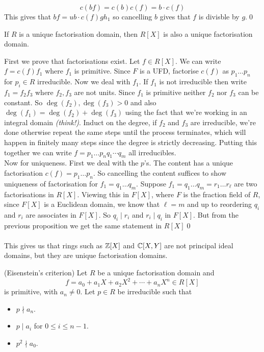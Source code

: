 \documentclass{article}
\begin{document}
\begin{itemize}
\[
  c(bf)=c(b)c(f)=b\cdot c(f)
\]
This gives that $ bf = ub\cdot c(f)gh_1 $ so cancelling $ b $ gives that $ f $ is divisble by $ g $.\qed
\begin{theorem}
	If $ R $ is a unique factorisation domain, then $ R[X] $ is also a unique factorisation domain.
\end{theorem}
\pf First we prove that factorisations exist. Let $ f\in R[X] $. We can write $ f = c(f)f_1 $ where $ f_1 $ is primitive. Since $ F $ is a UFD, factorise $ c(f) $ as $ p_1\dots p_n $ for $ p_i\in R $ irreducible. Now we deal with $ f_1 $. If $ f_1 $ is not irreducible then write $ f_1=f_2f_3 $ where $ f_2,f_3 $ are not units. Since $ f_1 $ is primitive neither $ f_2 $ nor $ f_3 $ can be constant. So $ \deg(f_2),\deg(f_3)>0 $ and also $ \deg(f_1)=\deg(f_2)+\deg(f_3) $ using the fact that we're working in an integral domain \textit{(think!)}. Induct on the degree, if $ f_2 $ and $ f_3 $ are irreducible, we're done otherwise repeat the same steps until the process terminates, which will happen in finitely many steps since the degree is strictly decreasing. Putting this together we can write $ f=p_1\dots p_nq_1\cdots q_m $ all irreducibles.\\
Now for uniqueness. First we deal with the $ p $'s. The content has a unique factorisation $ c(f)=p_1\dots p_n $. So cancelling the content suffices to show uniqueness of factorisation for $ f_1=q_1\dots q_m $. Suppose $ f_1=q_1\dots q_m=r_1\dots r_\ell $ are two factorisations in $ R[X] $. Viewing this in $ F[X] $, where $ F $ is the fraction field of $ R $, since $ F[X] $ is a Euclidean domain, we know that $ \ell=m $ and up to reordering $ q_i $ and $ r_i $ are associates in $ F[X] $. So $ q_i\mid r_i $ and $ r_i\mid q_i $ in $ F[X] $. But from the previous proposition we get the same statement in $ R[X] $\qed\\\\
This gives us that rings such as $ \mathbb{Z}[X] $ and $ \mathbb{C}[X,Y]  $ are not principal ideal domains, but they are unique factorisation domains.
\begin{theorem}
	(Eisenstein's criterion) Let $ R $ be a unique factorisation domain and 
	\[
		f=a_0+a_1X+a_2X^2+\cdots+a_nX^n\in R[X]
	\]
	is primitive, with $ a_n\ne 0 $. Let $ p\in R $ be irreducible such that         \begin{itemize}
		\item $ p\nmid a_n $.
		\item $ p\mid a_i $ for $ 0\le i\le n-1 $.
		\item $ p^2 \nmid a_0 $.

\end{itemize}
\end{theorem}
\end{itemize}
\end{document}
